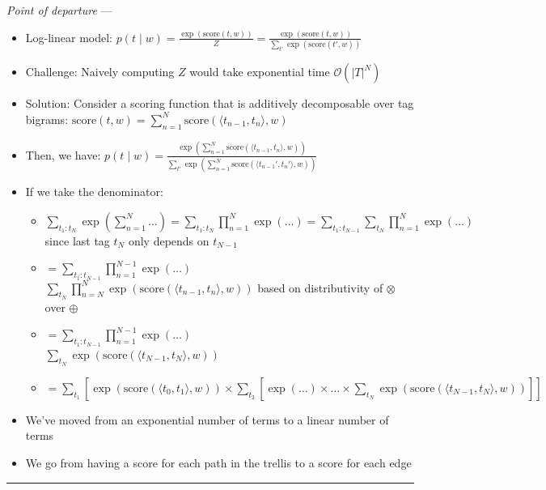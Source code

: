 \emph{Point of departure} --- 
\begin{itemize}
    \item Log-linear model:
    $
    p(t \mid w) = \frac{\exp(\textrm{score}(t, w))}{Z} = \frac{\exp(\textrm{score}(t, w))}{\sum_{t'} \exp(\textrm{score}(t', w))}
    $
    \item Challenge: Naively computing $Z$ would take exponential time $\mathcal{O}(|T|^N)$
    \item Solution: Consider a scoring function that is additively decomposable over tag bigrams:
    $
    \textrm{score}(t, w) = \sum_{n=1}^N \textrm{score}(\langle t_{n-1}, t_n \rangle, w)
    $
    \item Then, we have:
    $
    p(t \mid w) = \frac{\exp( \sum_{n=1}^N \textrm{score}(\langle t_{n-1}, t_n \rangle, w) )}{\sum_{t'} \exp( \sum_{n=1}^N \textrm{score}(\langle t_{n-1}', t_n' \rangle, w) )}
    $
    \item If we take the denominator:
    \begin{itemize}
        \item $
        \sum_{t_1:t_N} \exp( \sum_{n=1}^N \dots ) = \sum_{t_1:t_N} \prod_{n=1}^N \exp(\dots) = \sum_{t_1:t_{N-1}} \sum_{t_N} \prod_{n=1}^N \exp(\dots)
        $ since last tag $t_N$ only depends on $t_{N-1}$
        \item $ = \sum_{t_1:t_{N-1}} \prod_{n=1}^{N-1} \exp(\dots) $\\$\sum_{t_N} \prod_{n=N}^{N} \exp(\textrm{score}(\langle t_{n-1}, t_n \rangle, w) ) 
        $ based on distributivity of $\otimes$ over $\oplus$
        \item $ = \sum_{t_1:t_{N-1}} \prod_{n=1}^{N-1} \exp(\dots) $\\$\sum_{t_N} \exp(\textrm{score}(\langle t_{N-1}, t_N \rangle, w) ) 
        $
        \item $ = \sum_{t_1} [ \exp(\textrm{score}(\langle t_0, t_1 \rangle, w) ) \times \sum_{t_2} [ \exp(\dots) \times \dots \times \sum_{t_N} \exp(\textrm{score}(\langle t_{N-1}, t_N \rangle, w) )]]
        $
    \end{itemize}
    \item We've moved from an exponential number of terms to a linear number of terms
    \item We go from having a score for each path in the trellis to a score for each edge
\end{itemize}

{\color{lightgray}\hrule height 0.001mm}

